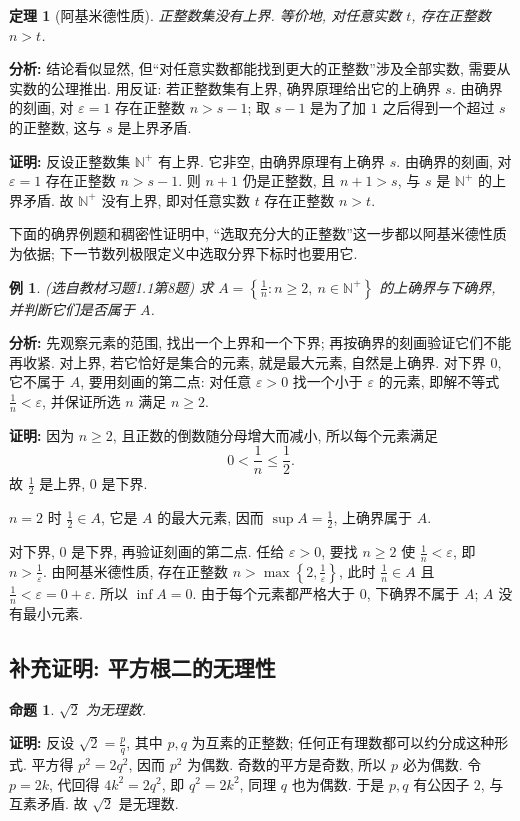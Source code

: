 \documentclass[UTF8,openany]{ctexbook}
\theoremstyle{chinesetextbook}
\newtheorem{example}{例}[section]
\newtheorem{theorem}{定理}[section]
\newenvironment{cnproof}{\par\indent\textbf{证明:} \ignorespaces}{\par}
\newtheorem*{propositionsingle}{命题}
\begin{document}
\begin{theorem}[阿基米德性质]
正整数集没有上界. 等价地, 对任意实数 $t$, 存在正整数 $n>t$.
\end{theorem}
\par\indent\textbf{分析:} 结论看似显然, 但“对任意实数都能找到更大的正整数”涉及全部实数, 需要从实数的公理推出. 用反证: 若正整数集有上界, 确界原理给出它的上确界 $s$. 由确界的刻画, 对 $\varepsilon=1$ 存在正整数 $n>s-1$; 取 $s-1$ 是为了加 $1$ 之后得到一个超过 $s$ 的正整数, 这与 $s$ 是上界矛盾.
\begin{cnproof}
反设正整数集 $\mathbb N^+$ 有上界. 它非空, 由确界原理有上确界 $s$. 由确界的刻画, 对 $\varepsilon=1$ 存在正整数 $n>s-1$. 则 $n+1$ 仍是正整数, 且 $n+1>s$, 与 $s$ 是 $\mathbb N^+$ 的上界矛盾. 故 $\mathbb N^+$ 没有上界, 即对任意实数 $t$ 存在正整数 $n>t$.
\end{cnproof}
下面的确界例题和稠密性证明中, “选取充分大的正整数”这一步都以阿基米德性质为依据; 下一节数列极限定义中选取分界下标时也要用它.
\begin{example}
\textnormal{(选自教材习题1.1第8题)} 求 $\displaystyle A=\left\{\frac1n:n\ge2,\ n\in\mathbb N^+\right\}$ 的上确界与下确界, 并判断它们是否属于 $A$.
\end{example}
\par\indent\textbf{分析:} 先观察元素的范围, 找出一个上界和一个下界; 再按确界的刻画验证它们不能再收紧. 对上界, 若它恰好是集合的元素, 就是最大元素, 自然是上确界. 对下界 $0$, 它不属于 $A$, 要用刻画的第二点: 对任意 $\varepsilon>0$ 找一个小于 $\varepsilon$ 的元素, 即解不等式 $\displaystyle\frac1n<\varepsilon$, 并保证所选 $n$ 满足 $n\ge2$.
\begin{cnproof}
因为 $n\ge2$, 且正数的倒数随分母增大而减小, 所以每个元素满足
\[
0<\frac1n\le\frac12.
\]
故 $\displaystyle\frac12$ 是上界, $0$ 是下界.

$n=2$ 时 $\displaystyle\frac12\in A$, 它是 $A$ 的最大元素, 因而 $\displaystyle\sup A=\frac12$, 上确界属于 $A$.

对下界, $0$ 是下界, 再验证刻画的第二点. 任给 $\varepsilon>0$, 要找 $n\ge2$ 使 $\displaystyle\frac1n<\varepsilon$, 即 $\displaystyle n>\frac1\varepsilon$. 由阿基米德性质, 存在正整数 $\displaystyle n>\max\left\{2,\frac1\varepsilon\right\}$, 此时 $\displaystyle\frac1n\in A$ 且 $\displaystyle\frac1n<\varepsilon=0+\varepsilon$. 所以 $\inf A=0$. 由于每个元素都严格大于 $0$, 下确界不属于 $A$; $A$ 没有最小元素.
\end{cnproof}
\subsection{补充证明: 平方根二的无理性}
\begin{propositionsingle}
$\sqrt2$ 为无理数.
\end{propositionsingle}
\begin{cnproof}
反设 $\displaystyle\sqrt2=\frac pq$, 其中 $p,q$ 为互素的正整数; 任何正有理数都可以约分成这种形式. 平方得 $p^2=2q^2$, 因而 $p^2$ 为偶数. 奇数的平方是奇数, 所以 $p$ 必为偶数. 令 $p=2k$, 代回得 $4k^2=2q^2$, 即 $q^2=2k^2$, 同理 $q$ 也为偶数. 于是 $p,q$ 有公因子 $2$, 与互素矛盾. 故 $\sqrt2$ 是无理数.
\end{cnproof}
\end{document}
